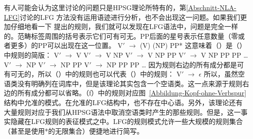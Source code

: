 有人可能会认为这里讨论的问题只是HPSG\indexlfgstartc 理论所特有的，第\ref{Abschnitt-NLA-LFG}讨论的LFG
方法没有运用语迹进行分析，也不会出现这一问题。如果我们更加仔细地看一下 \citet[]{Dalrymple2006a}提出的规则，我们就可以发现在LFG语法中，问题是完全一样的。范畴标签周围的括号表示它们可有可无。PP后面的星号表示任意数量（零或者更多）的PP可以出现在这一位置。
\ea
V$'$ $\to$ (V) (NP) PP*
\z
这意味着（）是（）中规则的简版：
\eal
\ex V$'$ $\to$ V
\ex V$'$ $\to$ V NP
\ex V$'$ $\to$ V NP PP
\ex V$'$ $\to$ V NP PP PP
\ex \ldots
\ex V$'$ $\to$ NP
\ex V$'$ $\to$ NP PP
\ex V$'$ $\to$ NP PP PP
\ex \ldots
\zl
因为规则右边的所有成分都是可有可无的，所以（）中的规则也可以代表（）中的规则：
\ea
V$'$ $\to$ $\epsilon$
\z
所以，虽然空语类没有明确列在词库中，但是该理论其实包含一个空语类。这一点来源于规则右边的所有成分都可以省略。（f）中的规则对应图~\ref{Abbildung-Kopf-ohne-Verbspur}结构中允准的模式。在允准的LFG结构中，也不存在中心语。另外，该理论还有大量规则对应于我们从HPSG语法中取消空语类时产生的那些规则。但是，这一事实隐藏在LFG规则的表征模式之中。LFG的规则模式允许一些大规模的规则集合（甚至是使用*的无限集合）便捷地进行简写\indexlfgendc。

